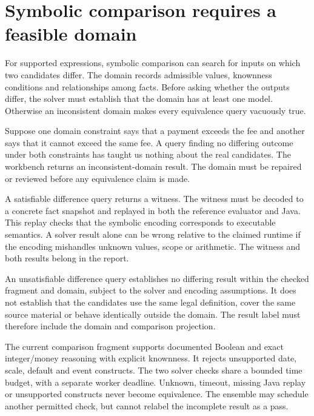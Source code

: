 \section{Symbolic comparison requires a feasible domain}
\label{merge:M07:07}


For supported expressions, symbolic comparison can search for inputs on which two
candidates differ. The domain records admissible values, knownness conditions and
relationships among facts. Before asking whether the outputs differ, the solver
must establish that the domain has at least one model. Otherwise an inconsistent
domain makes every equivalence query vacuously true.

Suppose one domain constraint says that a payment exceeds the fee and another
says that it cannot exceed the same fee. A query finding no differing outcome
under both constraints has taught us nothing about the real candidates. The
workbench returns an inconsistent-domain result. The domain must be repaired or
reviewed before any equivalence claim is made.

A satisfiable difference query returns a witness. The witness must be decoded to
a concrete fact snapshot and replayed in both the reference evaluator and Java.
This replay checks that the symbolic encoding corresponds to executable semantics.
A solver result alone can be wrong relative to the claimed runtime if the
encoding mishandles unknown values, scope or arithmetic. The witness and both
results belong in the report.


An unsatisfiable difference query establishes no differing result within the
checked fragment and domain, subject to the solver and encoding assumptions. It
does not establish that the candidates use the same legal definition, cover the
same source material or behave identically outside the domain. The result label
must therefore include the domain and comparison projection.

The current comparison fragment supports documented Boolean and exact
integer/money reasoning with explicit knownness. It rejects unsupported date,
scale, default and event constructs. The two solver checks share a bounded time
budget, with a separate worker deadline. Unknown, timeout, missing Java replay or
unsupported constructs never become equivalence. The ensemble may schedule
another permitted check, but cannot relabel the incomplete result as a pass.

